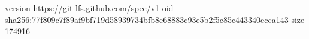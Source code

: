 version https://git-lfs.github.com/spec/v1
oid sha256:77f809c7f89af9bf719d58939734bfb8e68883c93e5b2f5c85c443340ecca143
size 174916
